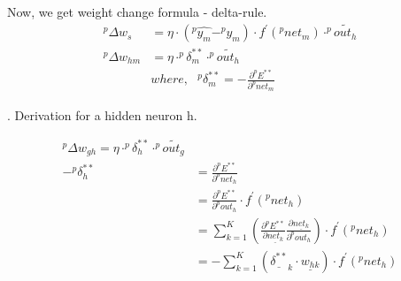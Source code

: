 \documentclass[fleqn]{article}
\begin{document}
Now, we get weight change formula - delta-rule.
\begin{equation*}
\begin{aligned}
^{ p }\Delta w_{ s } & =\eta \cdot (^{ p }\hat { y_{ m } } -^{ p }y_{ m }) \cdot f^{ ' }(^{ p }net_{ m })
\cdot ^{ p } \widetilde { out_{ h } } \\
^{ p }\Delta w_{ hm } & =\eta \cdot ^p \delta^{**} _m \cdot ^{ p } \widetilde { out_{ h } } \\
& where, \:\:\: ^p \delta^{**} _m = -\frac { \partial ^{ p }E^{**} }{ \partial ^{ p }net_{ m } }
\end{aligned}
\end{equation*}

. Derivation for a hidden neuron h.

\begin{equation*}
\begin{aligned}
^{ p }\Delta w_{ gh } =\eta \cdot ^p \delta^{**} _h \cdot ^{ p } \widetilde { out_{ g } } \\
-^p \delta^{**} _h &= \frac { \partial ^{ p }E^{**} }{ \partial ^{ p }net_{ h } }\\
&= \frac { \partial ^{ p }E^{**} }{ \partial ^{ p }out_{ h } } \cdot f^{ ' }(^{ p }net_{ h })     \\
&= \sum_{k=1}^{K} (\frac { \partial ^{ p }E^{**} }{ \partial \underline { net_k }  }\frac{ \partial \underline { net_k } }{ \partial ^{ p }out_{ h } }) \cdot f^{ ' }(^{ p }net_{ h })\\
&= -\sum_{k=1}^{K} (\underline{\delta^{**}}_k \cdot \underline{w_{hk}}) \cdot f^{ ' }(^{ p }net_{ h })\\
\end{aligned}
\end{equation*}
\end{document}
